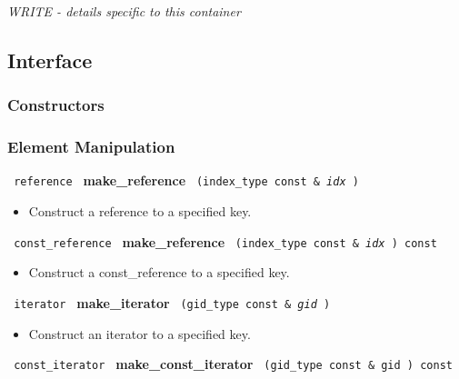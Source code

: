 \textit{WRITE - details specific to this container}

\subsection{Interface} \label{sec-unset-cont-inter}

\subsubsection{Constructors}

 
 
 
 
\subsubsection{Element Manipulation}

\noindent
\texttt{%
reference
}
\textbf{make\_reference}%
\texttt{%
(index\_type const \&
\textit{idx}%
)
}

\begin{itemize}
\item
Construct a reference to a specified key.
\end{itemize}
 
\noindent
\texttt{%
const\_reference
}
\textbf{make\_reference}%
\texttt{%
(index\_type const \&
\textit{idx}%
) const
}

\begin{itemize}
\item
Construct a const\_reference to a specified key.
\end{itemize}
 
\noindent
\texttt{%
iterator
}
\textbf{make\_iterator}%
\texttt{%
(gid\_type const \&
\textit{gid}%
)
}

\begin{itemize}
\item
Construct an iterator to a specified key.
\end{itemize}
 
\noindent
\texttt{%
const\_iterator 
}
\textbf{make\_const\_iterator}%
\texttt{%
(gid\_type const \&
gid
) const
}


